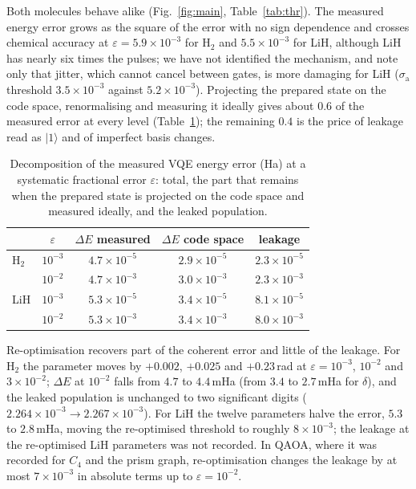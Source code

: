 \documentclass[reprint,aps,pra,amsmath,amssymb,superscriptaddress,letterpaper]{revtex4-2}
\newcommand{\HtwoThrEps}{5.9\times10^{-3}}
\newcommand{\LiHThrEps}{5.5\times10^{-3}}
\newcommand{\ket}[1]{\lvert #1\rangle}
\newcommand{\Hz}{\mathrm{H}_2}
\begin{document}
Both molecules behave alike (Fig.~\ref{fig:main}, Table~\ref{tab:thr}). The
measured energy error grows as the square of the error with no sign
dependence and crosses chemical accuracy at $\varepsilon=\HtwoThrEps$ for
$\Hz$ and $\LiHThrEps$ for LiH, although LiH has nearly six times the pulses;
we have not identified the mechanism, and note only that jitter, which cannot
cancel between gates, is more damaging for LiH ($\sigma_{\mathrm a}$ threshold
$3.5\times10^{-3}$ against $5.2\times10^{-3}$). Projecting the prepared state
on the code space, renormalising and measuring it ideally gives about $0.6$ of
the measured error at every level (Table~\ref{tab:decomp}); the remaining
$0.4$ is the price of leakage read as $\ket1$ and of imperfect basis changes.

\begin{table}[t]
\centering\small
\caption{Decomposition of the measured VQE energy error (Ha) at a systematic
fractional error $\varepsilon$: total, the part that remains when the prepared
state is projected on the code space and measured ideally, and the leaked
population.}
\label{tab:decomp}
\begin{tabular}{lcccc}
\toprule
 & $\varepsilon$ & $\Delta E$ measured & $\Delta E$ code space & leakage\\
\midrule
$\Hz$ & $10^{-3}$ & $4.7\times10^{-5}$ & $2.9\times10^{-5}$ & $2.3\times10^{-5}$\\
      & $10^{-2}$ & $4.7\times10^{-3}$ & $3.0\times10^{-3}$ & $2.3\times10^{-3}$\\
LiH   & $10^{-3}$ & $5.3\times10^{-5}$ & $3.4\times10^{-5}$ & $8.1\times10^{-5}$\\
      & $10^{-2}$ & $5.3\times10^{-3}$ & $3.4\times10^{-3}$ & $8.0\times10^{-3}$\\
\bottomrule
\end{tabular}
\end{table}

Re-optimisation recovers part of the coherent error and little of the
leakage. For $\Hz$ the parameter moves by $+0.002$, $+0.025$ and $+0.23$\,rad
at $\varepsilon=10^{-3}$, $10^{-2}$ and $3\times10^{-2}$; $\Delta E$ at
$10^{-2}$ falls from $4.7$ to $4.4$\,mHa (from $3.4$ to $2.7$\,mHa for
$\delta$), and the leaked population is unchanged to two significant digits
($2.264\times10^{-3}\to2.267\times10^{-3}$). For LiH the twelve parameters
halve the error, $5.3$ to $2.8$\,mHa, moving the re-optimised threshold to
roughly $8\times10^{-3}$; the leakage at the re-optimised LiH parameters was
not recorded. In QAOA, where it was recorded for $C_4$ and the prism graph,
re-optimisation changes the leakage by at most $7\times10^{-3}$ in absolute
terms up to $\varepsilon=10^{-2}$.
\end{document}
